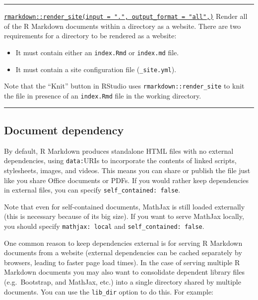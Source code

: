 \documentclass[
  a4paper,
  twoside,
  openright]{book}
\providecommand{\tightlist}{%
  \setlength{\itemsep}{0pt}\setlength{\parskip}{0pt}}
\theoremstyle{definition}
\theoremstyle{definition}
\theoremstyle{definition}
\theoremstyle{definition}
\theoremstyle{remark}
\begin{document}
\begin{center}\rule{0.5\linewidth}{0.5pt}\end{center}

\href{https://pkgs.rstudio.com/rmarkdown/reference/render_site.html}{\texttt{rmarkdown::render\_site(input\ =\ ".",\ output\_format\ =\ "all",)}} Render all of the R Markdown documents within a directory as a website. There are two requirements for a directory to be rendered as a website:

\begin{itemize}
\tightlist
\item
  It must contain either an \texttt{index.Rmd} or \texttt{index.md} file.
\item
  It must contain a site configuration file (\texttt{\_site.yml}).
\end{itemize}

Note that the ``Knit'' button in RStudio uses \texttt{rmarkdown::render\_site} to knit the file in presence of an \texttt{index.Rmd} file in the working directory.

\begin{center}\rule{0.5\linewidth}{0.5pt}\end{center}

\subsection{Document dependency}\label{document-dependency}

By default, R Markdown produces standalone HTML files with no external dependencies, using \texttt{data:}URIs to incorporate the contents of linked scripts, stylesheets, images, and videos. This means you can share or publish the file just like you share Office documents or PDFs. If you would rather keep dependencies in external files, you can specify \texttt{self\_contained:\ false}.

Note that even for self-contained documents, MathJax is still loaded externally (this is necessary because of its big size). If you want to serve MathJax locally, you should specify \texttt{mathjax:\ local} and \texttt{self\_contained:\ false}.

One common reason to keep dependencies external is for serving R Markdown documents from a website (external dependencies can be cached separately by browsers, leading to faster page load times). In the case of serving multiple R Markdown documents you may also want to consolidate dependent library files (e.g.~Bootstrap, and MathJax, etc.) into a single directory shared by multiple documents. You can use the \texttt{lib\_dir} option to do this. For example:
\end{document}
